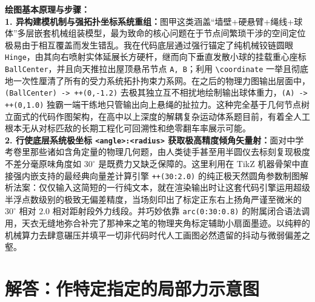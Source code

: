 \documentclass[12pt, a4paper]{ctexrep}
\begin{document}
\vspace{0.6cm}

{\small\color{blue!70!black}
\textbf{绘图基本原理与步骤：}\\
\textbf{1. 异构建模机制与强拓扑坐标系统重组：}图甲这类涵盖“墙壁+硬悬臂+绳线+球体”多层嵌套机械组装模型，最为致命的核心问题在于节点间繁琐干涉的空间定位极易由于相互覆盖而发生错乱。我在代码底层通过强行锚定了纯机械铰链圆眼 \texttt{Hinge}，由其向右喷射实体延展长方硬杆，继而向下垂直发散小球的挂载重心座标 \texttt{BallCenter}，并且向天推拉出屋顶悬吊节点 \texttt{A, B}；利用 \texttt{\textbackslash coordinate} 一举且彻底地一次性厘清了所有的受力系统拓扑拘束力系网。在之后的物理力图输出层面中，\texttt{(BallCenter) -> ++(0,-1.2)} 去极其独立互不相扰地绘制输出球体重力，\texttt{(A) -> ++(0,1.0)} 独霸一端干练地只管输出向上悬绳的扯拉力。这种完全基于几何节点树立面式的代码作图架构，在高中以上深度的解耦复杂运动体系题目前，有着全人工根本无从对标匹敌的长期工程化可回溯性和绝零翻车率展示可能。\\
\textbf{2. 行使底层系统极坐标 \texttt{<angle>:<radius>} 获取极高精度倾角矢量射：}面对中学考卷里那些诸如含角定量的物理几何题，由人类徒手甚至用半圆仪去标刻复现极度不差分毫原味角度如 $30^{\circ}$ 是既费力又缺乏保障的。这里利用在 TikZ 机器骨架中直接强内嵌支持的最经典向量差计算引擎 \texttt{++(30:2.0)} 的纯正极天然圆角参数制图解析法案：仅仅输入这简短的一行纯文本，就在渲染输出时让这套代码引擎运用超级半浮点数级别的极致无偏差精度，当场刻印出了标定正东右上扬角严谨至微米的 $30^{\circ}$ 相对 $2.0$ 相对距射段外力线段。并巧妙依靠 \texttt{arc(0:30:0.8)} 的附属闭合语法调用，天衣无缝地弥合补完了那神来之笔的物理夹角标定辅助小扇面墨迹。以纯粹的机械算力去肆意碾压并填平一切非代码时代人工画图必然遗留的抖动与微弱偏差之壑。
}




\section{解答：作特定指定的局部力示意图}

\vspace{0.6cm}
\end{document}
